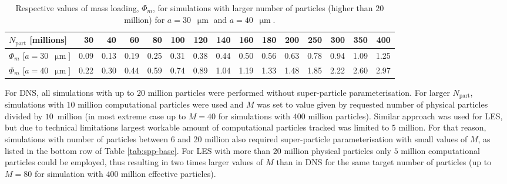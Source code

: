 \documentclass{pracamgren}
\begin{document}
\begin{table}[ht]
\centering
\scriptsize
\begin{tabular}{lrrrrrrrrrrrrrr}
$N_{\text{part}}$ [millions] & 30 & 40 & 60 & 80 & 100 & 120 & 140 & 160 & 180 & 200 & 250 & 300 & 350 & 400 \\ \hline
$\Phi_m$ [$a = 30$~$\upmu\text{m}$] & 0.09 & 0.13 & 0.19 & 0.25 & 0.31 & 0.38 & 0.44 & 0.50 & 0.56 & 0.63 & 0.78 & 0.94 & 1.09 & 1.25 \\
$\Phi_m$ [$a = 40$~$\upmu\text{m}$] & 0.22 & 0.30 & 0.44 & 0.59 & 0.74 & 0.89 & 1.04 & 1.19 & 1.33 & 1.48 & 1.85 & 2.22 & 2.60 & 2.97 \\
\end{tabular}
\caption{Respective values of mass loading, $\Phi_m$, for simulations with larger number of particles (higher than $20$ million) for ${a = 30}$~$\upmu\text{m}$ and ${a = 40}$~$\upmu\text{m}$.
}
\label{tab:spp-ext}
\end{table}


For DNS, all simulations with up to $20$ million particles were performed without super-particle parameterisation.
For larger $N_{\text{part}}$, simulations with $10$ million computational particles were used and $M$ was set to value given by requested number of physical particles divided by $10$~million (in most extreme case up to $M = 40$ for simulations with $400$ million particles).
Similar approach was used for LES, but due to technical limitations largest workable amount of computational particles tracked was limited to $5$ million.
For that reason, simulations with number of particles between 6 and 20 million also required super-particle parameterisation with small values of $M$, as listed in the bottom row of Table \ref{tab:spp-base}.
For LES with more than $20$ million physical particles only $5$ million computational particles could be employed, thus resulting in two times larger values of $M$ than in DNS for the same target number of particles (up to $M=80$ for simulation with $400$ million effective particles).


\printbibliography[title=References]
\end{document}
